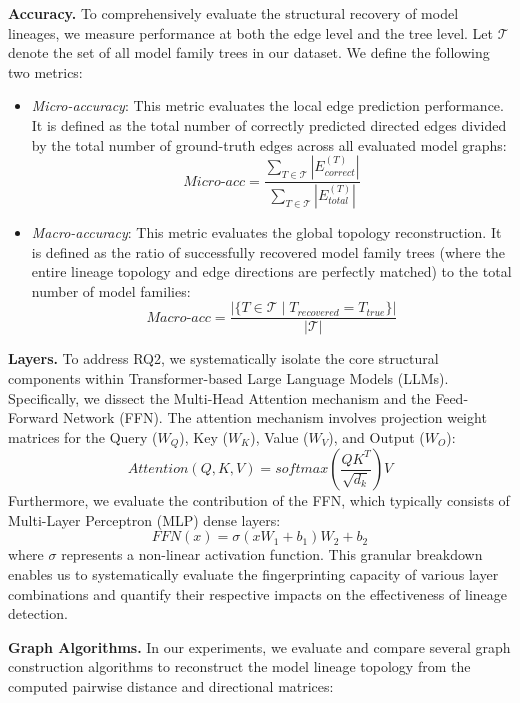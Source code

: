 \textbf{Accuracy.} To comprehensively evaluate the structural recovery of model lineages, we measure performance at both the edge level and the tree level. Let $\mathcal{T}$ denote the set of all model family trees in our dataset. We define the following two metrics:

\begin{itemize}[leftmargin=*]
    \item \textit{Micro-accuracy}: This metric evaluates the local edge prediction performance. It is defined as the total number of correctly predicted directed edges divided by the total number of ground-truth edges across all evaluated model graphs:
    $$Micro\text{-}acc = \frac{\sum_{T \in \mathcal{T}} |E_{correct}^{(T)}|}{\sum_{T \in \mathcal{T}} |E_{total}^{(T)}|}$$
    \item \textit{Macro-accuracy}: This metric evaluates the global topology reconstruction. It is defined as the ratio of successfully recovered model family trees (where the entire lineage topology and edge directions are perfectly matched) to the total number of model families:
    $$Macro\text{-}acc = \frac{|\{T \in \mathcal{T} \mid T_{recovered} = T_{true}\}|}{|\mathcal{T}|}$$
\end{itemize}

\textbf{Layers.} To address RQ2, we systematically isolate the core structural components within Transformer-based Large Language Models (LLMs). Specifically, we dissect the Multi-Head Attention mechanism and the Feed-Forward Network (FFN). The attention mechanism involves projection weight matrices for the Query ($W_Q$), Key ($W_K$), Value ($W_V$), and Output ($W_O$):
$$Attention(Q,K,V) = softmax\left(\frac{QK^T}{\sqrt{d_k}}\right)V$$
Furthermore, we evaluate the contribution of the FFN, which typically consists of Multi-Layer Perceptron (MLP) dense layers:
$$FFN(x) = \sigma(x W_1 + b_1) W_2 + b_2$$
where $\sigma$ represents a non-linear activation function. This granular breakdown enables us to systematically evaluate the fingerprinting capacity of various layer combinations and quantify their respective impacts on the effectiveness of lineage detection.

\textbf{Graph Algorithms.} In our experiments, we evaluate and compare several graph construction algorithms to reconstruct the model lineage topology from the computed pairwise distance and directional matrices:

